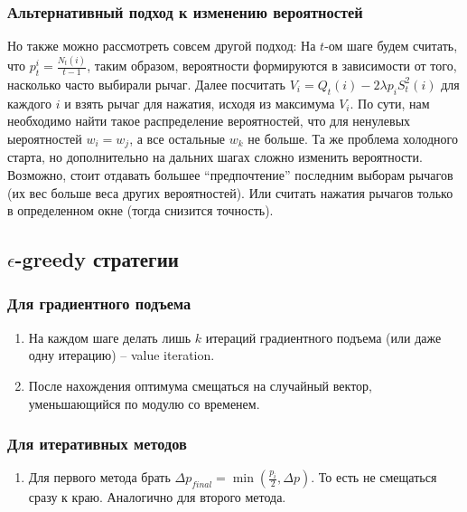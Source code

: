 \subsubsection{Альтернативный подход к изменению вероятностей} \label{subsubsec:iterative_greedy_changing_two_probs}

Но также можно рассмотреть совсем другой подход: На $t$-ом шаге будем считать, что $p_t^i = \frac{N_t(i)}{t-1}$, таким образом, вероятности формируются в зависимости от того, насколько часто выбирали рычаг. Далее посчитать $V_i = Q_t(i) - 2 \lambda p_i S_t^2(i)$ для каждого $i$ и взять рычаг для нажатия, исходя из максимума $V_i$. По сути, нам необходимо найти такое распределение вероятностей, что для ненулевых ыероятностей $w_i = w_j$, а все остальные $w_k$ не больше. Та же проблема холодного старта, но дополнительно на дальних шагах сложно изменить вероятности. Возможно, стоит отдавать большее ``предпочтение'' последним выборам рычагов (их вес больше веса других вероятностей). Или считать нажатия рычагов только в определенном окне (тогда снизится точность).

\subsection{\(\epsilon\)-greedy стратегии}

\subsubsection{Для градиентного подъема}

\begin{enumerate}
    \item На каждом шаге делать лишь $k$ итераций градиентного подъема (или даже одну итерацию) -- value iteration.
    \item После нахождения оптимума смещаться на случайный вектор, уменьшающийся по модулю со временем.
\end{enumerate}

\subsubsection{Для итеративных методов}
\begin{enumerate}
    \item Для первого метода брать $\Delta p_{final} = \min (\frac{p_i}{2}, \Delta p)$. То есть не смещаться сразу к краю. Аналогично для второго метода.
\end{enumerate}

